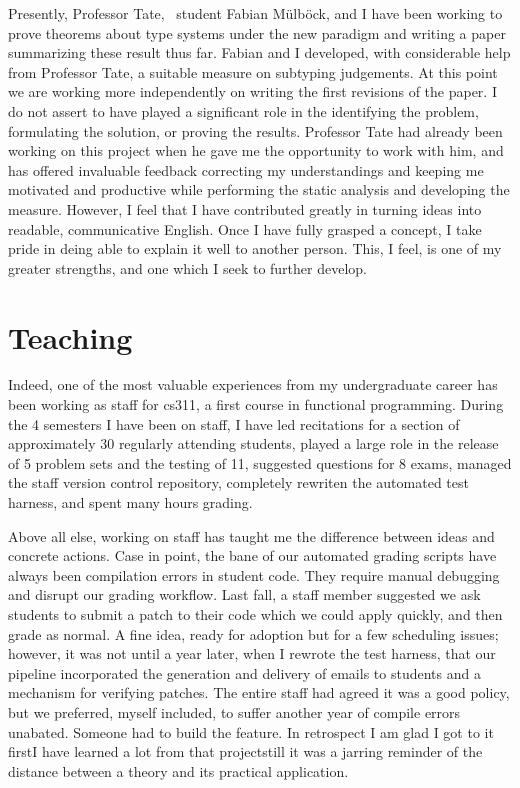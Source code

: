 \documentclass{article}
\begin{document}
Presently, Professor Tate, \phd\ student Fabian M\"{u}lb\"{o}ck, and I have been working to prove theorems about type systems under the new paradigm and writing a paper summarizing these result thus far.
Fabian and I developed, with considerable help from Professor Tate, a suitable measure on subtyping judgements.
At this point we are working more independently on writing the first revisions of the paper.
I do not assert to have played a significant role in the identifying the problem, formulating the solution, or proving the results.
Professor Tate had already been working on this project when he gave me the opportunity to work with him, and has offered invaluable feedback correcting my understandings and keeping me motivated and productive while performing the static analysis and developing the measure.
However, I feel that I have contributed greatly in turning ideas into readable, communicative English.
Once I have fully grasped a concept, I take pride in deing able to explain it well to another person.
This, I feel, is one of my greater strengths, and one which I seek to further develop.

\section{Teaching}
Indeed, one of the most valuable experiences from my undergraduate career has been working as staff for cs311, a first course in functional programming.
During the 4 semesters I have been on staff, I have led recitations for a section of approximately 30 regularly attending students, played a large role in the release of 5 problem sets and the testing of 11, suggested questions for 8 exams, managed the staff version control repository, completely rewriten the automated test harness, and spent many hours grading.

Above all else, working on staff has taught me the difference between ideas and concrete actions.
Case in point, the bane of our automated grading scripts have always been compilation errors in student code.
They require manual debugging and disrupt our grading workflow. 
Last fall, a staff member suggested we ask students to submit a patch to their code which we could apply quickly, and then grade as normal.
A fine idea, ready for adoption but for a few scheduling issues; however, it was not until a year later, when I rewrote the test harness, that our pipeline incorporated the generation and delivery of emails to students and a mechanism for verifying patches.
The entire staff had agreed it was a good policy, but we preferred, myself included, to suffer another year of compile errors unabated.
Someone had to build the feature.
In retrospect I am glad I got to it first\textemdash I have learned a lot from that project\textemdash still it was a jarring reminder of the distance between a theory and its practical application.
\end{document}
